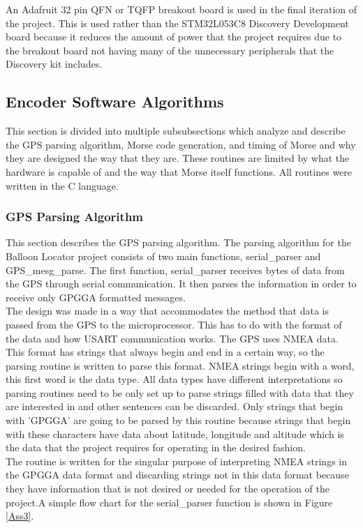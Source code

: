\documentclass[12pt, letterpaper]{article}
\begin{document}
An Adafruit 32 pin QFN or TQFP breakout board is used in the final iteration of the project. This is used rather than the STM32L053C8 Discovery Development board because it reduces the amount of power that the project requires due to the breakout board not having many of the unnecessary peripherals that the Discovery kit includes.

\subsection{Encoder Software Algorithms}
This section is divided into multiple subsubsections which analyze and describe the GPS parsing algorithm, Morse code generation, and timing of Morse and why they are designed the way that they are. These routines are limited by what the hardware is capable of and the way that Morse itself functions. All routines were written in the C language.

\subsubsection{GPS Parsing Algorithm}
This section describes the GPS parsing algorithm. The parsing algorithm for the Balloon Locator project consists of two main functions, serial\_parser and GPS\_mesg\_parse. The first function, serial\_parser receives bytes of data from the GPS through serial communication. It then parses the information in order to receive only GPGGA formatted messages.  \\

The design was made in a way that accommodates the method that data is passed from the GPS to the microprocessor. This has to do with the format of the data and how USART communication works. The GPS uses NMEA data. This format has strings that always begin and end in a certain way, so the parsing routine is written to parse this format. NMEA strings begin with a word, this first word is the data type. All data types have different interpretations so parsing routines need to be only set up to parse strings filled with data that they are interested in and other sentences can be discarded. Only strings that begin with 'GPGGA' are going to be parsed by this routine because strings that begin with these characters have data about latitude, longitude and altitude which is the data that the project requires for operating in the desired fashion.\\

The routine is written for the singular purpose of interpreting NMEA strings in the GPGGA data format and discarding strings not in this data format because they have information that is not desired or needed for the operation of the project.A simple flow chart for the serial\_parser function is shown in Figure \ref{Ass3}.
\end{document}
